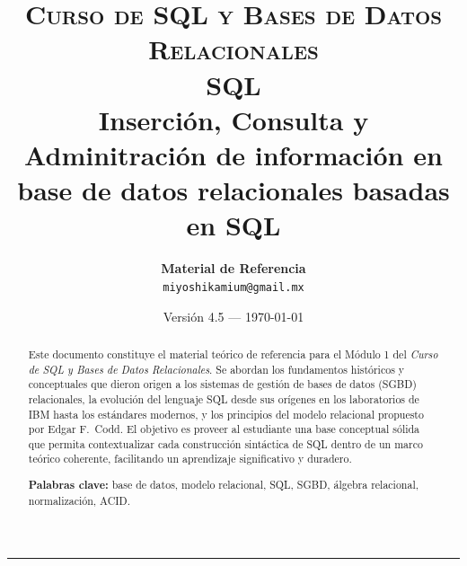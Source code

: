 \documentclass[12pt, a4paper]{article}
\title{%
  {\large \textsc{Curso de SQL y Bases de Datos Relacionales}}\\[6pt]
  {\LARGE \textbf{SQL}}\\[4pt]
  {\large Inserción, Consulta y Adminitración de información en base de datos relacionales basadas en SQL}
}
\author{%
  \textbf{Material de Referencia }\\[2pt]
  \small \texttt{miyoshikamium@gmail.mx}
}
\date{\small Versión 4.5 — \today}
\begin{document}
\maketitle
\thispagestyle{fancy}

\begin{abstract}
\noindent
Este documento constituye el material teórico de referencia para el
Módulo 1 del \textit{Curso de SQL y Bases de Datos Relacionales}.
Se abordan los fundamentos históricos y conceptuales que dieron origen
a los sistemas de gestión de bases de datos (SGBD) relacionales, la
evolución del lenguaje SQL desde sus orígenes en los laboratorios de
IBM hasta los estándares modernos, y los principios del modelo
relacional propuesto por Edgar F.\ Codd.
El objetivo es proveer al estudiante una base conceptual sólida que
permita contextualizar cada construcción sintáctica de SQL dentro de
un marco teórico coherente, facilitando un aprendizaje significativo
y duradero.

\smallskip
\textbf{Palabras clave:} base de datos, modelo relacional, SQL, SGBD,
álgebra relacional, normalización, ACID.
\end{abstract}

\tableofcontents
\vspace{8pt}
\hrule
\vspace{10pt}






\end{document}

